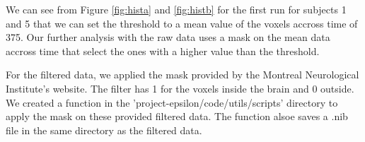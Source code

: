 \par We can see from Figure \ref{fig:hista} and \ref{fig:histb} for the first run for
subjects 1 and 5 that we can set the threshold to a mean value of the voxels accross
time of 375. Our further analysis with the raw data uses a mask on the mean data accross
time that select the ones with a higher value than the threshold.

\par For the filtered data, we applied the mask provided by the Montreal Neurological 
Institute's website. The filter has 1 for the voxels inside the brain and 0 outside.
We created a function in the 'project-epsilon/code/utils/scripts' directory to 
apply the mask on these provided filtered data. The function alsoe saves a .nib file in
the same directory as the filtered data.

